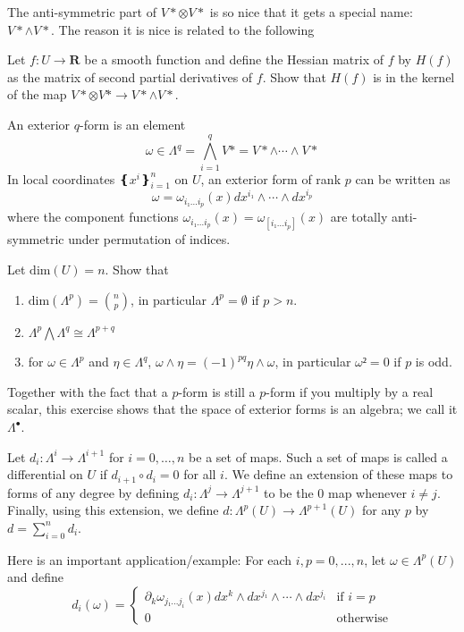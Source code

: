 The anti-symmetric part of $V* ⊗ V*$ is so nice that it gets a special name: $V*\wedge V*$. The reason it is nice is related to the following 
\begin{exercise}
Let $f:U→ 𝐑$ be a smooth function and define the Hessian matrix of $f$ by $H(f)$ as the matrix of second partial derivatives of $f$. Show that $H(f)$ is in the kernel of the map $V*⊗ V*→ V*\wedge V*$. 
\end{exercise} 
An exterior $q$-form is an element 
$$
ω ∈ Λ^q = ⋀_{i=1}^q V*= V*\wedge \cdots \wedge  V*
$$
In local coordinates $❴x^i❵_{i=1}^n$ on $U$, an exterior form of rank $p$ can be written as 
$$
ω = ω_{i₁ ... i_p}(x) dx^{i₁} \wedge \cdots \wedge dx^{i_p}
$$
where the component functions $ω_{i₁ ... i_p}(x) = ω_{[i₁ ... i_p]}(x)$ are totally anti-symmetric under permutation of indices.
\begin{exercise}
Let $\mathrm{dim}(U)=n$. Show that 
\begin{enumerate}
	\item $\mathrm{dim}(Λ^p) = {n \choose p}$, in particular $Λ^p = ∅$ if $p>n$. 
	\item $Λ^p ⋀ Λ^q ≅ Λ^{p+q}$
	\item for $ω ∈ Λ^p$ and $η ∈ Λ^q$, $ω \wedge η = (-1)^{pq} η \wedge ω$, in particular $ω² = 0$ if $p$ is odd. 
\end{enumerate}
\end{exercise}
Together with the fact that a $p$-form is still a $p$-form if you multiply by a real scalar, this exercise shows that the space of exterior forms is an algebra; we call it $Λ^∙$. 
\begin{definition}
Let $d_i : Λ^i → Λ^{i+1}$ for $i=0,\dots,n$ be a set of maps. 
Such a set of maps is called a differential on $U$ if $d_{i+1} ∘ d_i = 0$ for all $i$. 
We define an extension of these maps to forms of any degree by defining $d_i : Λ^j → Λ^{j+1}$ to be the 0 map whenever $i≠ j$. Finally, using this extension, we define $d : Λ^p(U) → Λ^{p+1}(U)$ for any $p$ by $d = ∑_{i=0}^n d_i$. 
\end{definition}
Here is an important application/example: For each $i,p=0,...,n$, let $ω∈ Λ^p(U)$ and define 
$$
d_i(ω) = \begin{cases}
	∂_k ω_{j₁ ... j_i}(x) dx^k \wedge dx^{j₁} \wedge \cdots \wedge dx^{j_i} & \textrm{if } i=p\\
	0 & \textrm{otherwise} 
	\end{cases}
$$
